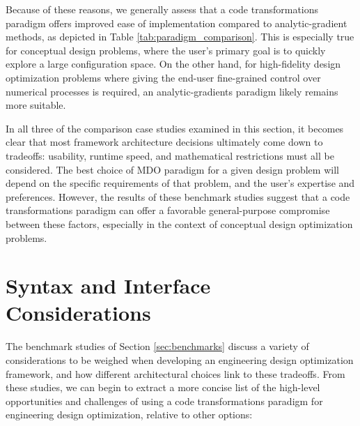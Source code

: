Because of these reasons, we generally assess that a code transformations paradigm offers improved ease of implementation compared to analytic-gradient methods, as depicted in Table \ref{tab:paradigm_comparison}. This is especially true for conceptual design problems, where the user's primary goal is to quickly explore a large configuration space. On the other hand, for high-fidelity design optimization problems where giving the end-user fine-grained control over numerical processes is required, an analytic-gradients paradigm likely remains more suitable.

In all three of the comparison case studies examined in this section, it becomes clear that most framework architecture decisions ultimately come down to tradeoffs: usability, runtime speed, and mathematical restrictions must all be considered. The best choice of MDO paradigm for a given design problem will depend on the specific requirements of that problem, and the user's expertise and preferences. However, the results of these benchmark studies suggest that a code transformations paradigm can offer a favorable general-purpose compromise between these factors, especially in the context of conceptual design optimization problems.


\section{Syntax and Interface Considerations}
\label{sec:syntax-interface}

The benchmark studies of Section \ref{sec:benchmarks} discuss a variety of considerations to be weighed when developing an engineering design optimization framework, and how different architectural choices link to these tradeoffs. From these studies, we can begin to extract a more concise list of the high-level opportunities and challenges of using a code transformations paradigm for engineering design optimization, relative to other options:

